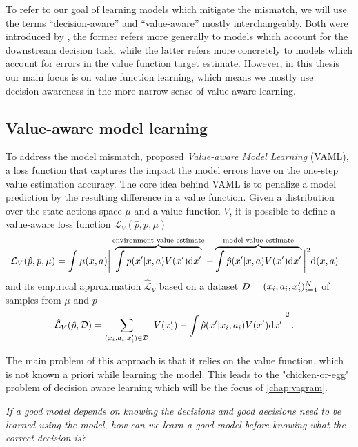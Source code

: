 To refer to our goal of learning models which mitigate the mismatch, we will use the terms ``decision-aware'' and ``value-aware'' mostly interchangeably.
Both were introduced by \textcite{vaml}, the former refers more generally to models which account for the downstream decision task, while the latter refers more concretely to models which account for errors in the value function target estimate.
However, in this thesis our main focus is on value function learning, which means we mostly use decision-awareness in the more narrow sense of value-aware learning.

\subsection{Value-aware model learning}

To address the model mismatch, \textcite{vaml} proposed \emph{Value-aware Model Learning} (VAML), a loss function that captures the impact the model errors have on the one-step value estimation accuracy.
The core idea behind VAML is to penalize a model prediction by the resulting difference in a value function. Given a distribution over the state-actions space $\mu$ and a value function $V$, it is possible to define a value-aware loss function $\mathcal{L}_V(\hat{p}, p, \mu)$
\begin{align}
    &\mathcal{L}_V(\hat{p}, p, \mu) = \int \mu(x,a) \bigg|\overbrace{\int p(x'|x,a)V(x')\mathrm{d}x'}^{\text{environment value estimate}}  - \overbrace{\int \hat{p}(x'|x,a) V(x') \mathrm{d}x'}^{\text{model value estimate}}\bigg|^2 \mathrm{d} (x,a)
\end{align}
and its empirical approximation $\hat{\mathcal{L}}_V$ based on a dataset $D = (x_i,a_i,x'_i)_{i=1}^N$ of samples from $\mu$ and $p$
\begin{align}
    &\hat{\mathcal{L}}_V(\hat{p}, \mathcal{D}) = \sum_{(x_i,a_i,x'_i)\in\mathcal{D}} \left|V(x'_i) - \int \hat{p}(x'|x_i,a_i) V(x') \mathrm{d} x'\right|^2\label{eq:background:IterVAMLloss}.
\end{align}

The main problem of this approach is that it relies on the value function, which is not known a priori while learning the model. 
This leads to the "chicken-or-egg" problem of decision aware learning which will be the focus of \autoref{chap:vagram}.

\emph{If a good model depends on knowing the decisions and good decisions need to be learned using the model, how can we learn a good model before knowing what the correct decision is?}

